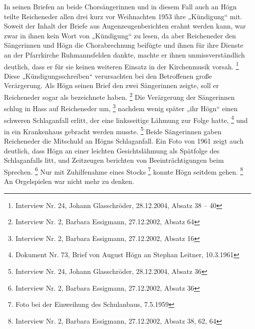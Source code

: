 In seinen Briefen an beide Chorsängerinnen und in diesem Fall auch an
Högn teilte Reicheneder allen drei kurz vor Weihnachten 1953 ihre
„Kündigung“ mit. Soweit der Inhalt der Briefe aus Augenzeugenberichten
erahnt werden kann, war zwar in ihnen kein Wort von „Kündigung“ zu
lesen, da aber Reicheneder den Sängerinnen und Högn die Chorabrechnung
beifügte und ihnen für ihre Dienste an der Pfarrkirche Ruhmannsfelden
dankte, machte er ihnen unmissverständlich deutlich, dass er für sie
keinen weiteren Einsatz in der Kirchenmusik vorsah. \footnote{Interview
Nr. 24, Johann Glasschröder, 28.12.2004, Absatz 38 – 40} Diese
„Kündigungsschreiben“ verursachten bei den Betroffenen große
Verärgerung. Als Högn seinen Brief den zwei Sängerinnen zeigte, soll er
Reicheneder sogar als  bezeichnete
haben. \footnote{Interview Nr. 2, Barbara Essigmann, 27.12.2002, Absatz
64} Die Verärgerung der Sängerinnen schlug in Hass auf Reicheneder
um, \footnote{Interview Nr. 2, Barbara Essigmann, 27.12.2002, Absatz
16} nachdem wenig später „ihr Högn“ einen schweren Schlaganfall erlitt,
der eine linksseitige Lähmung zur Folge hatte, \footnote{Dokument Nr.
73, Brief von August Högn an Stephan Leitner, 10.3.1961} und in ein
Krankenhaus gebracht werden musste. \footnote{Interview Nr. 24, Johann
Glasschröder, 28.12.2004, Absatz 36} Beide Sängerinnen gaben
Reicheneder die Mitschuld an Högns Schlaganfall. Ein Foto von 1961
zeigt auch deutlich, dass Högn an einer leichten Gesichtslähmung als
Spätfolge des Schlaganfalls litt, und Zeitzeugen berichten von
Beeinträchtigungen beim Sprechen. \footnote{Interview Nr. 2, Barbara
Essigmann, 27.12.2002, Absatz 36} Nur mit Zuhilfenahme eines
Stocks \footnote{Foto bei der Einweihung des Schulanbaus, 7.5.1959}
konnte Högn seitdem gehen. \footnote{Interview Nr. 2, Barbara
Essigmann, 27.12.2002, Absatz 38, 62, 64} An Orgelspielen war nicht
mehr zu denken.

